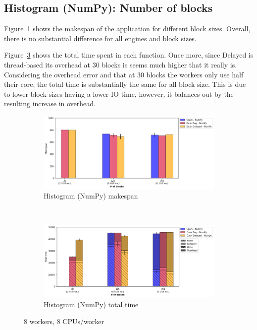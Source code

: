 \documentclass[conference]{IEEEtran}
\begin{document}
\subsection{Histogram (NumPy): Number of blocks}
Figure~\ref{fig:histo_np_ms_block} shows the makespan of the application for
different block sizes. Overall, there is no substantial difference for
all engines and block sizes.

Figure~\ref{fig:histo_np_tt_block} shows the total time spent in each function.
Once more, since Delayed is thread-based its overhead at 30 blocks is seems much
higher that it really is. Considering the overhead error and that at 30 blocks
the workers only use half their core, the total time is substantially the same
for all block size. This is due to lower block sizes having a lower IO time,
however, it balances out by the resulting increase in overhead.

\begin{figure}[!t]
    \centering
    \begin{subfigure}[b]{\columnwidth}
        \includegraphics[clip,width=\columnwidth]{images/histo_np_block.png}%
        \caption{Histogram (NumPy) makespan}\label{fig:histo_np_ms_block}
    \end{subfigure}
    \\
    \begin{subfigure}[b]{\columnwidth}
        \includegraphics[clip,width=\columnwidth]{images/histo_idle_np_block.png}%
        \caption{Histogram (NumPy) total time}\label{fig:histo_np_tt_block}
    \end{subfigure}
    \caption{8 workers, 8 CPUs/worker}
\end{figure}
\end{document}

